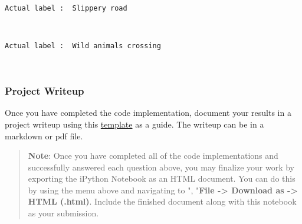 \documentclass[11pt]{article}
\begin{document}
    \begin{center}
    \end{center}
    { \hspace*{\fill} \\}
    
    \begin{Verbatim}[commandchars=\\\{\}]
Actual label :  Slippery road

    \end{Verbatim}

    \begin{center}
    \end{center}
    { \hspace*{\fill} \\}
    
    \begin{Verbatim}[commandchars=\\\{\}]
Actual label :  Wild animals crossing

    \end{Verbatim}

    \begin{center}
    \end{center}
    { \hspace*{\fill} \\}
    
    \subsubsection{Project Writeup}\label{project-writeup}

Once you have completed the code implementation, document your results
in a project writeup using this
\href{https://github.com/udacity/CarND-Traffic-Sign-Classifier-Project/blob/master/writeup_template.md}{template}
as a guide. The writeup can be in a markdown or pdf file.

    \begin{quote}
\textbf{Note}: Once you have completed all of the code implementations
and successfully answered each question above, you may finalize your
work by exporting the iPython Notebook as an HTML document. You can do
this by using the menu above and navigating to \n", "\textbf{File
-\textgreater{} Download as -\textgreater{} HTML (.html)}. Include the
finished document along with this notebook as your submission.
\end{quote}
\end{document}
